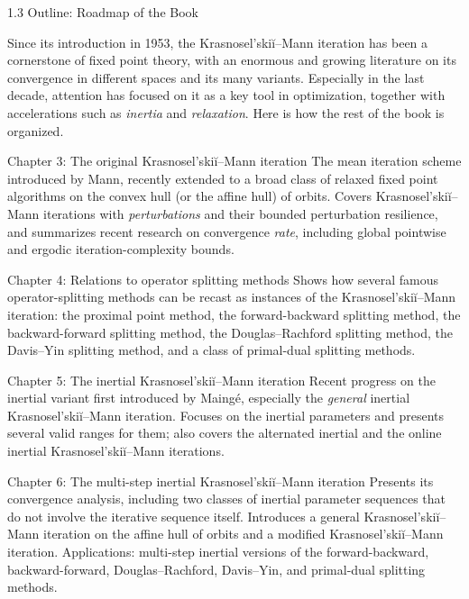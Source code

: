 \documentclass[aspectratio=169,10pt]{beamer}
\begin{document}
\begin{frame}[allowframebreaks]{1.3 Outline: Roadmap of the Book}

Since its introduction in 1953, the Krasnosel'ski\u{i}--Mann iteration has
been a cornerstone of fixed point theory, with an enormous and growing
literature on its convergence in different spaces and its many variants.
Especially in the last decade, attention has focused on it as a key tool
in optimization, together with accelerations such as \emph{inertia} and
\emph{relaxation}. Here is how the rest of the book is organized.

\begin{block}{Chapter 3: The original Krasnosel'ski\u{i}--Mann iteration}
The mean iteration scheme introduced by Mann, recently extended to a
broad class of relaxed fixed point algorithms on the convex hull (or the
affine hull) of orbits. Covers Krasnosel'ski\u{i}--Mann iterations with
\emph{perturbations} and their bounded perturbation resilience, and
summarizes recent research on convergence \emph{rate}, including global
pointwise and ergodic iteration-complexity bounds.
\end{block}

\framebreak

\begin{block}{Chapter 4: Relations to operator splitting methods}
Shows how several famous operator-splitting methods can be recast as
instances of the Krasnosel'ski\u{i}--Mann iteration: the proximal point
method, the forward-backward splitting method, the backward-forward
splitting method, the Douglas--Rachford splitting method, the Davis--Yin
splitting method, and a class of primal-dual splitting methods.
\end{block}

\begin{block}{Chapter 5: The inertial Krasnosel'ski\u{i}--Mann iteration}
Recent progress on the inertial variant first introduced by Maing\'e,
especially the \emph{general} inertial Krasnosel'ski\u{i}--Mann iteration.
Focuses on the inertial parameters and presents several valid ranges for
them; also covers the alternated inertial and the online inertial
Krasnosel'ski\u{i}--Mann iterations.
\end{block}

\framebreak

\begin{block}{Chapter 6: The multi-step inertial Krasnosel'ski\u{i}--Mann iteration}
Presents its convergence analysis, including two classes of inertial
parameter sequences that do not involve the iterative sequence itself.
Introduces a general Krasnosel'ski\u{i}--Mann iteration on the affine hull
of orbits and a modified Krasnosel'ski\u{i}--Mann iteration. Applications:
multi-step inertial versions of the forward-backward, backward-forward,
Douglas--Rachford, Davis--Yin, and primal-dual splitting methods.
\end{block}


\end{frame}
\end{document}
